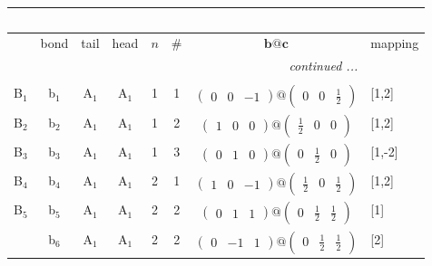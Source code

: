 \documentclass[fleqn,10pt,landscape]{article}
\begin{document}
\begin{itemize}
\begin{center}
\begin{longtable}{cc|cc|c|c|c|l}
\multicolumn{7}{l}{\tablename\ \thetable{}} \\
 \hline \hline
 & bond & tail & head & $n$ & \# & $\bm{b}@\bm{c}$ & mapping \\ \hline \endhead

 \hline \hline
\multicolumn{7}{r}{\footnotesize\it continued ...} \\ \endfoot

 \hline \hline
\multicolumn{7}{r}{} \\ \endlastfoot

B$_{1}$ & b$_{1}$ & A$_{1}$ & A$_{1}$ & 1 & 1 & $\begin{pmatrix} 0 & 0 & -1 \end{pmatrix}@\begin{pmatrix} 0 & 0 & \frac{1}{2} \end{pmatrix}$ & [1,2] \\ \hline
B$_{2}$ & b$_{2}$ & A$_{1}$ & A$_{1}$ & 1 & 2 & $\begin{pmatrix} 1 & 0 & 0 \end{pmatrix}@\begin{pmatrix} \frac{1}{2} & 0 & 0 \end{pmatrix}$ & [1,2] \\ \hline
B$_{3}$ & b$_{3}$ & A$_{1}$ & A$_{1}$ & 1 & 3 & $\begin{pmatrix} 0 & 1 & 0 \end{pmatrix}@\begin{pmatrix} 0 & \frac{1}{2} & 0 \end{pmatrix}$ & [1,-2] \\ \hline
B$_{4}$ & b$_{4}$ & A$_{1}$ & A$_{1}$ & 2 & 1 & $\begin{pmatrix} 1 & 0 & -1 \end{pmatrix}@\begin{pmatrix} \frac{1}{2} & 0 & \frac{1}{2} \end{pmatrix}$ & [1,2] \\ \hline
B$_{5}$ & b$_{5}$ & A$_{1}$ & A$_{1}$ & 2 & 2 & $\begin{pmatrix} 0 & 1 & 1 \end{pmatrix}@\begin{pmatrix} 0 & \frac{1}{2} & \frac{1}{2} \end{pmatrix}$ & [1] \\
& b$_{6}$ & A$_{1}$ & A$_{1}$ & 2 & 2 & $\begin{pmatrix} 0 & -1 & 1 \end{pmatrix}@\begin{pmatrix} 0 & \frac{1}{2} & \frac{1}{2} \end{pmatrix}$ & [2] \\ \hline

\end{longtable}
\end{center}
\end{itemize}
\end{document}
